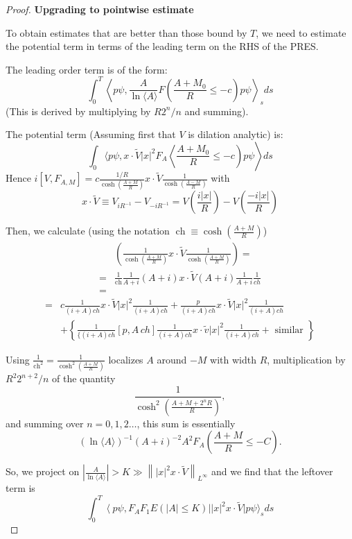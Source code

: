 \documentclass[11pt]{article}
\begin{document}
\begin{proof}
{\bf Upgrading to pointwise estimate}

To obtain estimates that are better than those bound by $T$, we need to estimate the potential term in terms of the leading term on the RHS of the PRES.


The leading order term is of the form:
$$
\int_{0}^{T}\left\langle p \psi, \frac{A}{\ln \langle A \rangle} F\left(\frac{A+M_{0}}{R} \leq-c\right) p \psi\right\rangle_{s} d s
$$
(This is derived by multiplying by $R 2^{n} / n$ and summing).


The potential term (Assuming first that $V$ is dilation analytic) is:
 $$\left.\int_{0}\langle p \psi, x \cdot \tilde{V}|x|^{2} F_{A}\left\langle\frac{A+M_{0}}{R} \leqslant-c\right) p \psi\right\rangle d s$$
Hence $i\left[V, F_{A, M}\right]=c \frac{1 / R}{\cosh \left(\frac{A+M}{R}\right)} x \cdot \tilde{V} \frac{1}{\cosh \left(\frac{A-M}{R}\right)}$
with
$$
x\cdot \tilde{V} \equiv V_{i R^{-1}}-V_{-i R^{-1}}=V\left(\frac{i|x|}{R}\right)-V\left(\frac{-i|x|}{R}\right)
$$

Then, we calculate (using the notation $\operatorname{ch} \equiv \cosh \left(\frac{A+M}{R}\right)$)
$$
\begin{aligned}
& \left(\frac{1}{\cosh \left(\frac{A+M}{R}\right)} x \cdot \tilde{V} \frac{1}{\cosh \left(\frac{A+M}{R}\right)}\right)= \\
= & \frac{1}{\operatorname{ch}} \frac{1}{A+i}(A+i) x \cdot \tilde{V}(A+i) \frac{1}{A+i} \frac{1}{ch} \\
= &
\end{aligned}
$$
$$
\begin{aligned}
= & c \frac{1}{(i+A) ch} x\cdot \tilde{V}|x|^2\frac{1}{(i+A) ch}+\frac{p}{(i+A) ch} x\cdot \tilde{V}|x|^2 \frac{1}{(i+A) ch} \\
& +\left\{\frac{1}{\{(i+A) c h}\left[p, A\, ch\right] \frac{1}{(i+A) c h} x\cdot \tilde{v}|x|^{2} \frac{1}{(i+A) ch}+\text { similar }\right\}
\end{aligned}
$$

Using $\frac{1}{\operatorname{ch}^{2}}=\frac{1}{\cosh ^{2}\left(\frac{A+M}{R}\right)}$ localizes 
$A$ around $-M$ with width $R$, multiplication by $R^{2} 2^{n+2} / n$ of the quantity
$$
\frac{1}{\cosh ^{2}\left(\frac{A+M+2^{n} R}{R}\right)},
$$
 and summing over $n=0,1,2 \ldots$,
this sum is essentially
$$
(\ln \langle A\rangle)^{-1}(A+i)^{-2} A^{2} F_{A}\left(\frac{A+M}{R} \leq-C\right) .
$$

So, we project on $\left|\frac{A}{\ln \langle A\rangle}\right|>K \gg\left\||x|^{2} x \cdot \tilde{V}\right\|_{L^{\infty}}$ 
and we find that the leftover term is
$$
\int_{0}^{T}\left\langle p \psi, F_{A} F_{1} E(|A| \leqslant K)\right||x|^{2} x \cdot \tilde{V}|p \psi\rangle_{s} d s
$$


\end{proof}
\end{document}
